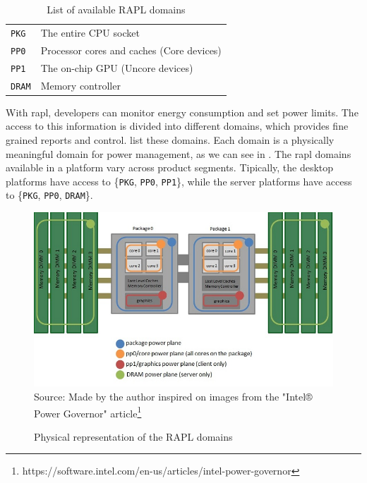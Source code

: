 \begin{table}[htp]
	\caption{List of available RAPL domains}
	\label{tbl:rapl-sensors}
	\centering
	\begin{tabular}{ll}
	  \toprule
	  \texttt{PKG}  & The entire CPU socket\\
    \texttt{PP0}  & Processor cores and caches (Core devices)\\
    \texttt{PP1}  & The on-chip GPU (Uncore devices)\\
    \texttt{DRAM} & Memory controller\\
	  \bottomrule
	\end{tabular}
\end{table}

With \ac{rapl}, developers can monitor energy consumption and set power limits. The access to this information is divided into different domains, which provides fine grained reports and control.  list these domains. Each domain is a physically meaningful domain for power management, as we can see in . The \ac{rapl} domains available in a platform vary across product segments. Tipically, the desktop platforms have access to \{\texttt{PKG}, \texttt{PP0}, \texttt{PP1}\}, while the server platforms have access to \{\texttt{PKG}, \texttt{PP0}, \texttt{DRAM}\}.

\begin{savenotes}
\begin{figure}[htp]
  \centering
  \caption{Physical representation of the RAPL domains}
  \includegraphics[width=\columnwidth]{images/power-planes-placeholder}
  \footnotesize{Source: Made by the author inspired on images from the "Intel® Power Governor" article\footnote{https://software.intel.com/en-us/articles/intel-power-governor}}
  \label{fig:power-planes}
\end{figure}
\end{savenotes}

